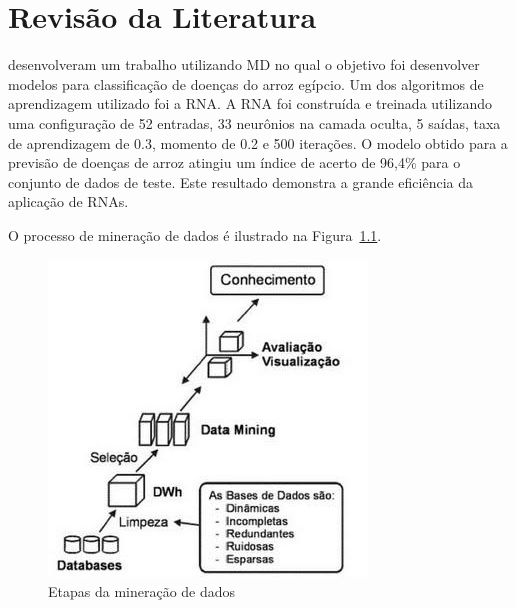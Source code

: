 \chapter{Revisão da Literatura}
 desenvolveram um trabalho utilizando MD no qual o objetivo foi desenvolver modelos para classificação de doenças do arroz egípcio. Um dos algoritmos de aprendizagem utilizado foi a RNA. A RNA foi construída e treinada utilizando uma configuração de 52 entradas, 33 neurônios na camada oculta, 5 saídas, taxa de aprendizagem de 0.3, momento de 0.2 e 500 iterações. O modelo obtido para a previsão de doenças de arroz atingiu um índice de acerto de 96,4\% para o conjunto de dados de teste. Este resultado demonstra a grande eficiência da aplicação de RNAs.

O processo de mineração de dados é ilustrado na Figura~\ref{fig:mineracao}.
\begin{figure}
	\centering
	\caption{Etapas da mineração de dados}\label{fig:mineracao}
	\includegraphics[scale=1.0]{mineracao}
	
\end{figure}


